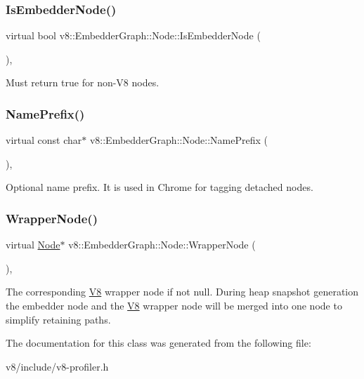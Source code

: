 \subsubsection{\texorpdfstring{Is\+Embedder\+Node()}{IsEmbedderNode()}}
{\footnotesize\ttfamily virtual bool v8\+::\+Embedder\+Graph\+::\+Node\+::\+Is\+Embedder\+Node (\begin{DoxyParamCaption}{ }\end{DoxyParamCaption})\hspace{0.3cm}{\ttfamily [inline]}, {\ttfamily [virtual]}}

Must return true for non-\/\+V8 nodes. \mbox{\label{classv8_1_1EmbedderGraph_1_1Node_a2c4c64b2c3eab48dcdc587aec8734ee8}} 
\subsubsection{\texorpdfstring{Name\+Prefix()}{NamePrefix()}}
{\footnotesize\ttfamily virtual const char$\ast$ v8\+::\+Embedder\+Graph\+::\+Node\+::\+Name\+Prefix (\begin{DoxyParamCaption}{ }\end{DoxyParamCaption})\hspace{0.3cm}{\ttfamily [inline]}, {\ttfamily [virtual]}}

Optional name prefix. It is used in Chrome for tagging detached nodes. \mbox{\label{classv8_1_1EmbedderGraph_1_1Node_acfe58e3b4db90c2ebbfcee5f81415181}} 
\subsubsection{\texorpdfstring{Wrapper\+Node()}{WrapperNode()}}
{\footnotesize\ttfamily virtual \mbox{\hyperlink{classv8_1_1EmbedderGraph_1_1Node}{Node}}$\ast$ v8\+::\+Embedder\+Graph\+::\+Node\+::\+Wrapper\+Node (\begin{DoxyParamCaption}{ }\end{DoxyParamCaption})\hspace{0.3cm}{\ttfamily [inline]}, {\ttfamily [virtual]}}

The corresponding \mbox{\hyperlink{classv8_1_1V8}{V8}} wrapper node if not null. During heap snapshot generation the embedder node and the \mbox{\hyperlink{classv8_1_1V8}{V8}} wrapper node will be merged into one node to simplify retaining paths. 

The documentation for this class was generated from the following file\+:\begin{DoxyCompactItemize}
\item 
v8/include/v8-\/profiler.\+h\end{DoxyCompactItemize}
